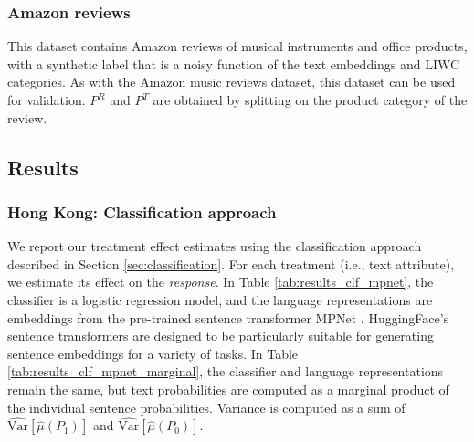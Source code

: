 \documentclass{article}
\begin{document}
\subsubsection{Amazon reviews}

This dataset contains Amazon reviews of musical instruments and office products, with a synthetic label that is a noisy function of the text embeddings and LIWC categories. As with the Amazon music reviews dataset, this dataset can be used for validation. $P^R$ and $P^T$ are obtained by splitting on the product category of the review.

\subsection{Results}

\subsubsection{Hong Kong: Classification approach}

We report our treatment effect estimates using the classification approach described in Section \ref{sec:classification}. For each treatment (i.e., text attribute), we estimate its effect on the \textit{response}. In Table \ref{tab:results_clf_mpnet}, the classifier is a logistic regression model, and the language representations are embeddings from the pre-trained sentence transformer MPNet \cite{song2020mpnet}. HuggingFace's sentence transformers are designed to be particularly suitable for generating sentence embeddings for a variety of tasks. In Table \ref{tab:results_clf_mpnet_marginal}, the classifier and language representations remain the same, but text probabilities are computed as a marginal product of the individual sentence probabilities. Variance is computed as a sum of $\widehat{\text{Var}}[\hat{\mu}(P_1)]$ and $\widehat{\text{Var}}[\hat{\mu}(P_0)]$.
\end{document}
